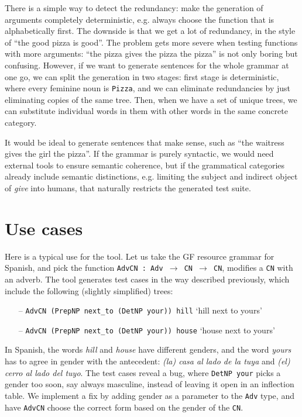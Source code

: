 \documentclass[11pt]{article}
\def\t#1{\texttt{#1}}
\begin{document}
There is a simple way to detect the redundancy: make the generation of
arguments completely deterministic, e.g. always choose the function
that is alphabetically first. The downside is that we get a lot of
redundancy, in the style of ``the good pizza is good''. The problem
gets more severe when testing functions with more arguments: ``the
pizza gives the pizza the pizza'' is not only boring but confusing.
However, if we want to generate sentences for the whole grammar at one 
go, we can split the generation in two stages: first stage is
deterministic, where every feminine noun is \t{Pizza}, and we can 
eliminate redundancies by just eliminating copies of the same
tree. Then, when we have a set of unique trees, we can substitute
individual words in them with other words in the same concrete
category.

It would be ideal to generate sentences that make sense,
such as ``the waitress gives the girl the pizza''. If the grammar is
purely syntactic, we would need external tools to ensure semantic
coherence, but if the grammatical categories already include semantic
distinctions, e.g. limiting the subject and indirect object of
\emph{give} into humans, that naturally restricts the generated test suite.

\section{Use cases}

Here is a typical use for the tool. 
Let us take the GF resource grammar \cite{ranta2009rgl} for Spanish, and
pick the function \t{AdvCN : Adv $\rightarrow$ CN $\rightarrow$ CN}, modifies a \t{CN} with
an adverb.
The tool generates test cases in the way described previously,
which include the following (slightly simplified) trees: 
\begin{itemize}
\setlength\itemsep{0em}
\item[--] \t{AdvCN (PrepNP next\_to (DetNP your)) hill} `hill next to
yours'
\item[--] \t{AdvCN (PrepNP next\_to (DetNP your)) house} `house next
to yours'
\end{itemize}
In Spanish, the words \emph{hill} and \emph{house} have different
genders, and the word \emph{yours} has to agree in gender 
with the antecedent: \emph{(la) casa al lado de la tuya} and \emph{(el)
  cerro al lado del tuyo}. The test cases reveal a bug, where \t{DetNP your} 
picks a gender too soon, say always masculine, instead of leaving it
open in an inflection table. We implement a fix by adding gender as a
parameter to the \t{Adv} type, and have \t{AdvCN} choose the correct
form based on the gender of the \t{CN}.
\end{document}
